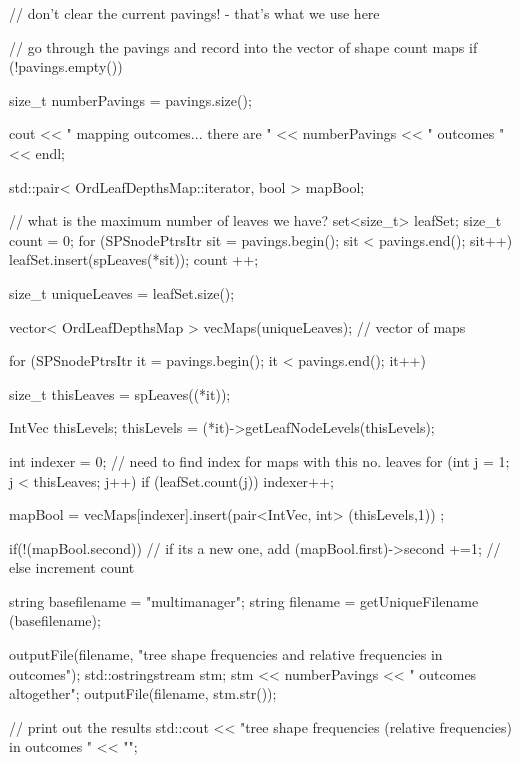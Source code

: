 \begin{DoxyCode}
{
    // don't clear the current pavings! - that's what we use here

    // go through the pavings and record into the vector of shape count maps
    if (!pavings.empty()) {

         size_t numberPavings = pavings.size();

        cout << " mapping outcomes... there are " << numberPavings
                        << " outcomes " << endl;

        std::pair< OrdLeafDepthsMap::iterator, bool > mapBool;

        // what is the maximum number of leaves we have?
        set<size_t> leafSet;
        size_t count = 0;
        for (SPSnodePtrsItr sit = pavings.begin(); sit < pavings.end(); sit++) 
      {
            leafSet.insert(spLeaves(*sit));
            count ++;
        }

        size_t uniqueLeaves = leafSet.size();

        vector< OrdLeafDepthsMap > vecMaps(uniqueLeaves); // vector of maps

        for (SPSnodePtrsItr it = pavings.begin(); it < pavings.end(); it++) {

            size_t thisLeaves = spLeaves((*it));

            IntVec thisLevels;
            thisLevels  = (*it)->getLeafNodeLevels(thisLevels);

            int indexer = 0; // need to find index for maps with this no.
       leaves
            for (int j = 1; j < thisLeaves; j++) {
                if (leafSet.count(j)) indexer++;
            }

            mapBool = vecMaps[indexer].insert(pair<IntVec, int> (thisLevels,1))
      ;

            if(!(mapBool.second)) // if its a new one, add
                (mapBool.first)->second +=1; // else increment count
        }

        string basefilename = "multimanager";
        string filename = getUniqueFilename (basefilename);

        outputFile(filename,
            "tree shape frequencies and relative frequencies in outcomes");
        std::ostringstream stm;
        stm << numberPavings << " outcomes altogether";
        outputFile(filename, stm.str());

        // print out the results
        std::cout << "tree shape frequencies (relative frequencies) in outcomes
      "
                << "\n";

}}
\end{DoxyCode}
